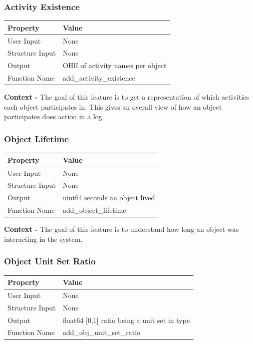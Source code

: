 \documentclass{article}
\begin{document}
\subsubsection{Activity Existence}
\begin{center}
	\begin{tabular}{| p{3cm} p{7cm} |}
		\hline
		\textbf{Property} & \textbf{Value}\\
		\hline
		User Input & None\\
		Structure Input & None\\
		Output & OHE of activity names per object\\
		Function Name & add\_activity\_existence\\
		\hline
	\end{tabular}
\end{center}

\textbf{Context -} The goal of this feature is to get a representation of which activities each object participates in. This gives an overall view of how an object participates does action in a log.\\

\subsubsection{Object Lifetime}
\begin{center}
	\begin{tabular}{| p{3cm} p{7cm} |}
		\hline
		\textbf{Property} & \textbf{Value}\\
		\hline
		User Input & None\\
		Structure Input & None\\
		Output & uint64 seconds an object lived\\
		Function Name & add\_object\_lifetime\\
		\hline
	\end{tabular}
\end{center}

\textbf{Context -} The goal of this feature is to understand how long an object was interacting in the system.\\

\subsubsection{Object Unit Set Ratio}
\begin{center}
	\begin{tabular}{| p{3cm} p{7cm} |}
		\hline
		\textbf{Property} & \textbf{Value}\\
		\hline
		User Input & None\\
		Structure Input & None\\
		Output & float64 [0,1] ratio being a unit set in type\\
		Function Name & add\_obj\_unit\_set\_ratio\\
		\hline
	\end{tabular}
\end{center}
\end{document}
